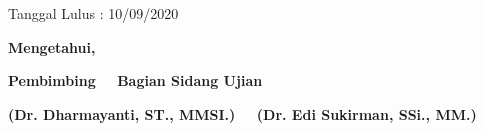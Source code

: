 \begin{center}
    \vspace{0.1cm}
    \begin{flushright}
        {Tanggal Lulus : 10/09/2020}
    \end{flushright}

    {\bf Mengetahui,}

    \vspace{0.5cm}

    {\bf Pembimbing~ \hspace{5.0cm} ~Bagian Sidang Ujian}%

    \vspace{2cm}

    {\bf(Dr. Dharmayanti, ST., MMSI.)~ \hfill ~(Dr. Edi Sukirman, SSi., MM.)}%


\end{center}
